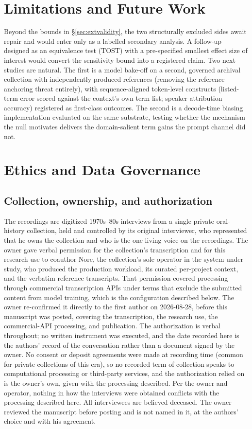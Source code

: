 \documentclass[11pt]{article}
\begin{document}
\section{Limitations and Future Work}
\label{sec:future}

Beyond the bounds in \S\ref{sec:extvalidity}, the two structurally excluded sides await repair and would enter only as a labelled secondary analysis. A follow-up designed as an equivalence test (TOST) with a pre-specified smallest effect size of interest would convert the sensitivity bound into a registered claim. Two next studies are natural. The first is a model bake-off on a second, governed archival collection with independently produced references (removing the reference-anchoring threat entirely), with sequence-aligned token-level constructs (listed-term error scored against the context's own term list; speaker-attribution accuracy) registered as first-class outcomes. The second is a decode-time biasing implementation evaluated on the same substrate, testing whether the mechanism the null motivates delivers the domain-salient term gains the prompt channel did not.

\section{Ethics and Data Governance}
\label{sec:ethics}

\subsection{Collection, ownership, and authorization}

The recordings are digitized 1970s--80s interviews from a single private oral-history collection, held and controlled by its original interviewer, who represented that he owns the collection and who is the one living voice on the recordings. The owner gave verbal permission for the collection's transcription and for this research use to coauthor Nore, the collection's sole operator in the system under study, who produced the production workload, its curated per-project context, and the verbatim reference transcripts. That permission covered processing through commercial transcription APIs under terms that exclude the submitted content from model training, which is the configuration described below. The owner re-confirmed it directly to the first author on 2026-08-28, before this manuscript was posted, covering the transcription, the research use, the commercial-API processing, and publication. The authorization is verbal throughout; no written instrument was executed, and the date recorded here is the authors' record of the conversation rather than a document signed by the owner. No consent or deposit agreements were made at recording time (common for private collections of this era), so no recorded term of collection speaks to computational processing or third-party services, and the authorization relied on is the owner's own, given with the processing described. Per the owner and operator, nothing in how the interviews were obtained conflicts with the processing described here. All interviewees are believed deceased. The owner reviewed the manuscript before posting and is not named in it, at the authors' choice and with his agreement.
\end{document}
